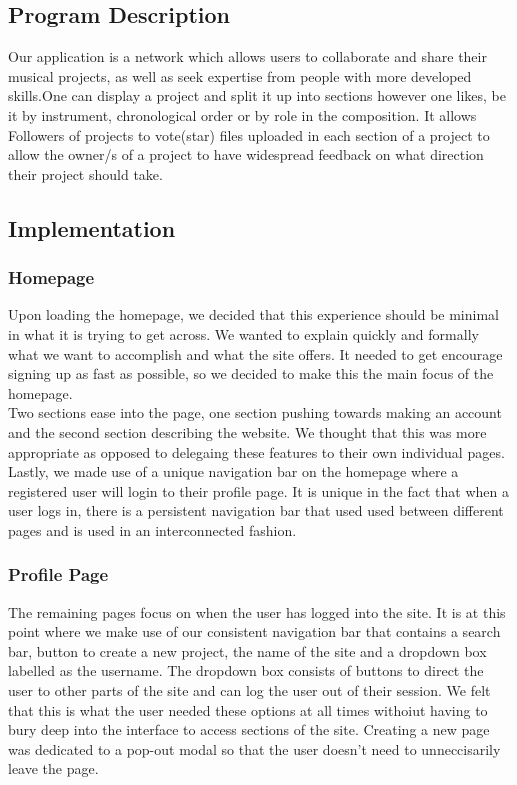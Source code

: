 \documentclass{article}
\begin{document}
\subsection{Program Description}
Our application is a network which allows users to collaborate and share their musical projects, as well as seek expertise from people with more developed skills.One can display a project and split it up into sections however one likes, be it by instrument, chronological order or by role in the composition. It allows Followers of projects to vote(star) files uploaded in each section of a project to allow the owner/s of a project to have widespread feedback on what direction their project should take.
\subsection{Implementation}
\subsubsection{Homepage}
Upon loading the homepage, we decided that this experience should be minimal in what it is trying to get across. We wanted to explain quickly and formally what we want to accomplish and what the site offers. It needed to get encourage signing up as fast as possible, so we decided to make this the main focus of the homepage. \\

Two sections ease into the page, one section pushing towards making an account and the second section describing the website. We thought that this was more appropriate as opposed to delegaing these features to their own individual pages. \\ 

Lastly, we made use of a unique navigation bar on the homepage where a registered user will login to their profile page. It is unique in the fact that when a user logs in, there is a persistent navigation bar that used used between different pages and is used in an interconnected fashion.

\subsubsection{Profile Page}
The remaining pages focus on when the user has logged into the site. It is at this point where we make use of our consistent navigation bar that contains a search bar, button to create a new project, the name of the site and a dropdown box labelled as the username. The dropdown box consists of buttons to direct the user to other parts of the site and can log the user out of their session. We felt that this is what the user needed these options at all times withoiut having to bury deep into the interface to access sections of the site. Creating a new page was dedicated to a pop-out modal so that the user doesn't need to unneccisarily leave the page. \\
\end{document}

